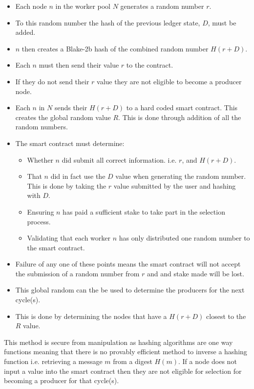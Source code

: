\documentclass{article}
\begin{document}
\begin{itemize} 

\item Each node $n$ in the worker pool $N$ generates a random number $r$.
\item To this random number the hash of the previous ledger state, $D$, must be added.
\item $n$ then creates a Blake-2b hash of the combined random number $H(r + D)$.
\item Each $n$ must then send their value $r$ to the contract. 
\item If they do not send their $r$ value they are not eligible to become a producer node.
\item Each $n$ in $N$ sends their $H(r + D)$ to a hard coded smart contract. This creates the global random value $R$. This is done through addition of all the random numbers.
\item The smart contract must determine:
\begin{itemize}
\item Whether $n$ did submit all correct information. i.e. $r$, and $H(r+D)$.
\item That $n$ did in fact use the $D$ value when generating the random number. This is done by taking the $r$ value submitted by the user and hashing with $D$. 
\item Ensuring $n$ has paid a sufficient stake to take part in the selection process. 
\item Validating that each worker $n$ has only distributed one random number to the smart contract. 
\end{itemize} 
\item Failure of any one of these points means the smart contract will not accept the submission of a random number from $r$ and and stake made will be lost. 
\item This global random can the be used to determine the producers for the next cycle(s). 
\item This is done by determining the nodes that have a $H(r + D)$ closest to the $R$ value. \\

\end{itemize} 


This method is secure from manipulation as hashing algorithms are one way functions meaning that there is no provably efficient method to inverse a hashing function i.e. retrieving a message $m$ from a digest $H(m)$. If a node does not input a value into the smart contract then they are not eligible for selection for becoming a producer for that cycle(s). \\
\end{document}
